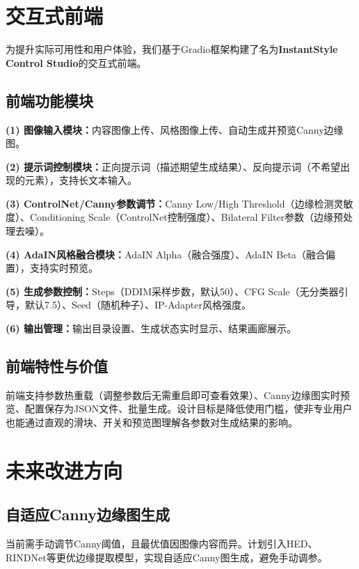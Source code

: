 \documentclass[twocolumn,a4paper,11pt]{ctexart}
\begin{document}
\section{交互式前端}

为提升实际可用性和用户体验，我们基于Gradio框架构建了名为\textbf{InstantStyle Control Studio}的交互式前端。

\subsection{前端功能模块}

{\bfseries (1) 图像输入模块：}内容图像上传、风格图像上传、自动生成并预览Canny边缘图。

{\bfseries (2) 提示词控制模块：}正向提示词（描述期望生成结果）、反向提示词（不希望出现的元素），支持长文本输入。

{\bfseries (3) ControlNet/Canny参数调节：}Canny Low/High Threshold（边缘检测灵敏度）、Conditioning Scale（ControlNet控制强度）、Bilateral Filter参数（边缘预处理去噪）。

{\bfseries (4) AdaIN风格融合模块：}AdaIN Alpha（融合强度）、AdaIN Beta（融合偏置），支持实时预览。

{\bfseries (5) 生成参数控制：}Steps（DDIM采样步数，默认50）、CFG Scale（无分类器引导，默认7.5）、Seed（随机种子）、IP-Adapter风格强度。

{\bfseries (6) 输出管理：}输出目录设置、生成状态实时显示、结果画廊展示。

\subsection{前端特性与价值}

前端支持参数热重载（调整参数后无需重启即可查看效果）、Canny边缘图实时预览、配置保存为JSON文件、批量生成。设计目标是降低使用门槛，使非专业用户也能通过直观的滑块、开关和预览图理解各参数对生成结果的影响。

\section{未来改进方向}

\subsection{自适应Canny边缘图生成}
当前需手动调节Canny阈值，且最优值因图像内容而异。计划引入HED、RINDNet等更优边缘提取模型，实现自适应Canny图生成，避免手动调参。
\end{document}
